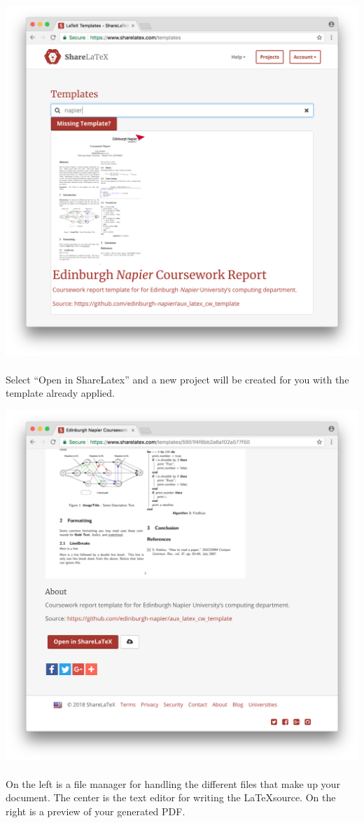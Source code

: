 \documentclass[10pt, a4paper, twosize]{article}
\begin{document}
\includegraphics[width=.8\textwidth]{images/latex_enu-template}

\paragraph{} Select ``Open in ShareLatex'' and a new project will be created for you with the template already applied.

\includegraphics[width=.8\textwidth]{images/latex_open-in}


\paragraph{} On the left is a file manager for handling the different files that make up your document. The center is the text editor for writing the \LaTeX source. On the right is a preview of your generated PDF.
\end{document}

